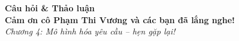\documentclass[aspectratio=169, 10pt]{beamer}
\begin{document}
\begin{frame}
    \begin{center}
        \vspace{1.5cm}
        {\huge \textbf{\color{primaryNavy}Câu hỏi \& Thảo luận}}\\[0.8cm]
        {\large \textbf{Cảm ơn cô Phạm Thi Vương và các bạn đã lắng nghe!}}\\[0.5cm]
        \textit{\color{secondarySlate}Chương 4: Mô hình hóa yêu cầu -- hẹn gặp lại!}
    \end{center}
\end{frame}
\end{document}
